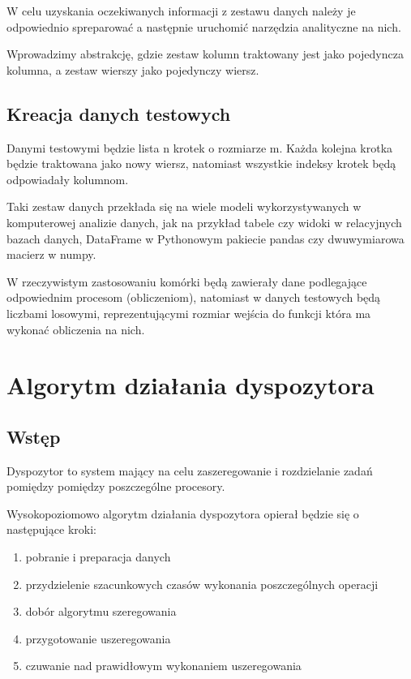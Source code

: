 \documentclass[brudnopis]{xmgr}
\begin{document}
W celu uzyskania oczekiwanych informacji z zestawu danych należy je odpowiednio spreparować a następnie uruchomić narzędzia analityczne na nich.

Wprowadzimy abstrakcję, gdzie zestaw kolumn traktowany jest jako pojedyncza kolumna, a zestaw wierszy jako pojedynczy wiersz.


\section{Kreacja danych testowych}

Danymi testowymi będzie lista n krotek o rozmiarze m.
Każda kolejna krotka będzie traktowana jako nowy wiersz, natomiast wszystkie indeksy krotek będą odpowiadały kolumnom. 


Taki zestaw danych przekłada się na wiele modeli wykorzystywanych w komputerowej analizie danych, jak na przykład tabele czy widoki w relacyjnych bazach danych, DataFrame w Pythonowym pakiecie pandas czy dwuwymiarowa macierz w numpy.

W rzeczywistym zastosowaniu komórki będą zawierały dane podlegające odpowiednim procesom (obliczeniom), natomiast w danych testowych będą liczbami losowymi, reprezentującymi rozmiar wejścia do funkcji która ma wykonać obliczenia na nich.

\chapter{Algorytm działania dyspozytora}

\section{Wstęp}

Dyspozytor to system mający na celu zaszeregowanie i rozdzielanie zadań pomiędzy pomiędzy poszczególne procesory.


Wysokopoziomowo algorytm działania dyspozytora opierał będzie się o następujące kroki:

\begin{enumerate}
    \item pobranie i preparacja danych
    \item przydzielenie szacunkowych czasów wykonania poszczególnych operacji
    \item dobór algorytmu szeregowania 
    \item przygotowanie uszeregowania
    \item czuwanie nad prawidłowym wykonaniem uszeregowania
\end{enumerate}
\end{document}
